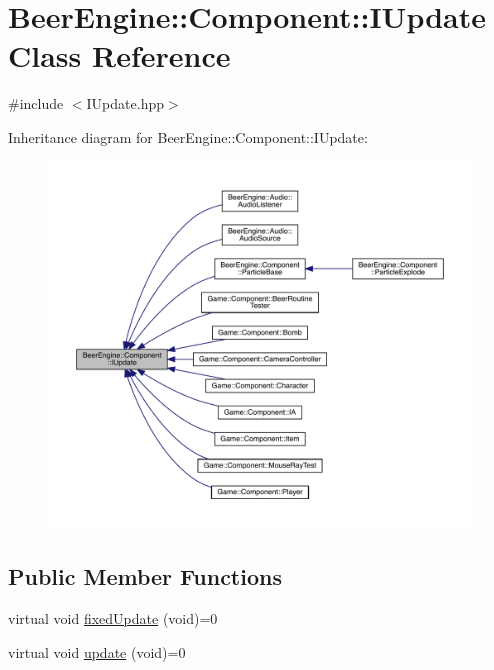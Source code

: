 \hypertarget{class_beer_engine_1_1_component_1_1_i_update}{}\section{Beer\+Engine\+:\+:Component\+:\+:I\+Update Class Reference}
\label{class_beer_engine_1_1_component_1_1_i_update}


{\ttfamily \#include $<$I\+Update.\+hpp$>$}



Inheritance diagram for Beer\+Engine\+:\+:Component\+:\+:I\+Update\+:
\nopagebreak
\begin{figure}[H]
\begin{center}
\leavevmode
\includegraphics[width=350pt]{class_beer_engine_1_1_component_1_1_i_update__inherit__graph}
\end{center}
\end{figure}
\subsection*{Public Member Functions}
\begin{DoxyCompactItemize}
\item 
virtual void \mbox{\hyperlink{class_beer_engine_1_1_component_1_1_i_update_a615c127a4729f73713e5eaeee538854b}{fixed\+Update}} (void)=0
\item 
virtual void \mbox{\hyperlink{class_beer_engine_1_1_component_1_1_i_update_aeeda0aa303175720e449b4c51d9867dd}{update}} (void)=0
\end{DoxyCompactItemize}


